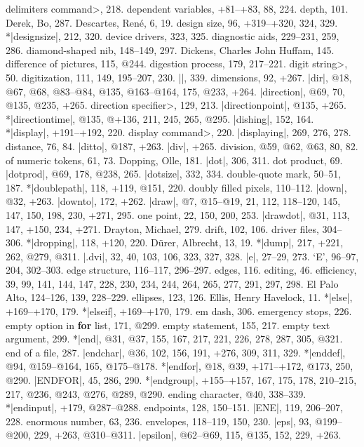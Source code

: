 \<delimiters command>, 218.
dependent variables, +81--+83, 88, 224.
depth, 101.
Derek, Bo, 287.
Descartes, Ren\'e, 6, 19.
design size, 96, +319--+320, 324, 329.
*|designsize|, 212, 320.
device drivers, 323, 325.
diagnostic aids, 229--231, 259, 286.
diamond-shaped nib, 148--149, 297.
Dickens, Charles John Huffam, 145.
difference of pictures, 115, @244.
digestion process, 179, 217--221.
\<digit string>, 50.
digitization, 111, 149, 195--207, 230.
|\digits|, 339.
dimensions, 92, +267.
|dir|, @18, @67, @68, @83--@84, @135, @163--@164, 175, @233, +264.
|direction|, @69, 70, @135, @235, +265.
\<direction specifier>, 129, 213.
|directionpoint|, @135, +265.
*|directiontime|, @135, @+136, 211, 245, 265, @295.
|dishing|, 152, 164.
*|display|, +191--+192, 220.
\<display command>, 220.
|displaying|, 269, 276, 278.
distance, 76, 84.
|ditto|, @187, +263.
|div|, +265.
division, @59, @62, @63, 80, 82.
\sub of numeric tokens, 61, 73.
Dopping, Olle, 181.
|dot|, 306, 311.
dot product, 69.
|dotprod|, @69, 178, @238, 265.
|dotsize|, 332, 334.
double-quote mark, 50--51, 187.
*|doublepath|, 118, +119, @151, 220.
doubly filled pixels, 110--112.
|down|, @32, +263.
|downto|, 172, +262.
|draw|, @7, @15--@19, 21, 112, 118--120, 145, 147, 150, 198, 230, +271, 295.
\sub one point, 22, 150, 200, 253.
|drawdot|, @31, 113, 147, +150, 234, +271.
Drayton, Michael, 279.
drift, 102, 106.
driver files, 304--306.
*|dropping|, 118, +120, 220.
D\"urer, Albrecht, 13, 19.
*|dump|, 217, +221, 262, @279, @311.
|.dvi|, 32, 40, 103, 106, 323, 327, 328.
\newletter
|e|, 27--29, 273.
`E', 96--97, 204, 302--303.
edge structure, 116--117, 296--297.
edges, 116.
editing, 46.
efficiency, 39, 99, 141, 144, 147, 228, 230, 234, 244, 264, 265, 277,
 291, 297, 298.
El Palo Alto, 124--126, 139, 228--229.
ellipses, 123, 126.
Ellis, Henry Havelock, 11.
*|else|, +169--+170, 179.
*|elseif|, +169--+170, 179.
em dash, 306.
emergency stops, 226.
empty option in {\bf for\/} list, 171, @299.
empty statement, 155, 217.
empty text argument, 299.
*|end|, @31, @37, 155, 167, 217, 221, 226, 278, 287, 305, @321.
end of a file, 287.
|endchar|, @36, 102, 156, 191, +276, 309, 311, 329.
*|enddef|, @94, @159--@164, 165, @175--@178.
*|endfor|, @18, @39, +171--+172, @173, 250, @290.
|ENDFOR|, 45, 286, 290.
*|endgroup|, +155--+157, 167, 175, 178, 210--215, 217, @236, @243,
 @276, @289, @290.
ending character, @40, 338--339.
*|endinput|, +179, @287--@288.
endpoints, 128, 150--151.
|ENE|, 119, 206--207, 228.
enormous number, 63, 236.
envelopes, 118--119, 150, 230.
|eps|, 93, @199--@200, 229, +263, @310--@311.
|epsilon|, @62--@69, 115, @135, 152, 229, +263.
